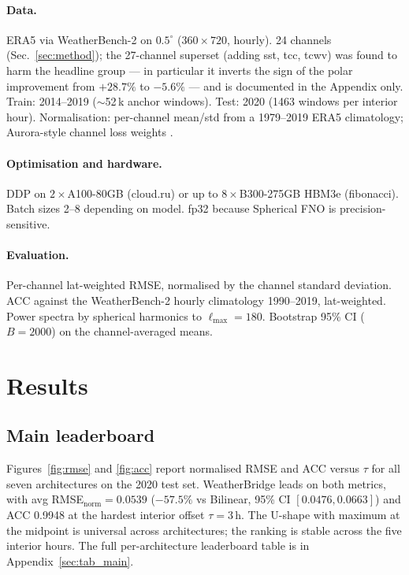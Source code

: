 \documentclass[10pt,letterpaper,twocolumn]{article}
\begin{document}
\paragraph{Data.} ERA5 \cite{hersbach2020era5} via WeatherBench-2
\cite{rasp2024weatherbench} on $0.5^\circ$ ($360{\times}720$, hourly).
24 channels (Sec.~\ref{sec:method}); the 27-channel superset (adding
sst, tcc, tcwv) was found to harm the headline group --- in particular it
inverts the sign of the polar improvement from $+28.7\%$ to $-5.6\%$ ---
and is documented in the Appendix only. Train: 2014--2019
($\sim$52\,k anchor windows). Test: 2020 (1463 windows per interior
hour). Normalisation: per-channel mean/std from a 1979--2019 ERA5
climatology; Aurora-style channel loss weights
\cite{bodnar2024aurora}.

\paragraph{Optimisation and hardware.} DDP on $2{\times}$A100-80GB
(cloud.ru) or up to $8{\times}$B300-275GB HBM3e (fibonacci). Batch sizes
2--8 depending on model. fp32 because Spherical FNO is precision-sensitive.

\paragraph{Evaluation.} Per-channel lat-weighted RMSE, normalised by the
channel standard deviation. ACC against the WeatherBench-2 hourly
climatology 1990--2019, lat-weighted. Power spectra by spherical
harmonics to $\ell_{\max}{=}180$. Bootstrap 95\% CI ($B{=}2000$) on the
channel-averaged means.

\section{Results}
\label{sec:results}

\subsection{Main leaderboard}

Figures~\ref{fig:rmse} and \ref{fig:acc} report normalised RMSE and
ACC versus $\tau$ for all seven architectures on the 2020 test set.
WeatherBridge leads on both metrics, with avg RMSE$_\text{norm}{=}0.0539$
($-57.5\%$ vs Bilinear, 95\% CI $[0.0476, 0.0663]$) and ACC 0.9948 at the
hardest interior offset $\tau{=}3\,$h. The U-shape with maximum at the
midpoint is universal across architectures; the ranking is stable
across the five interior hours. The full per-architecture leaderboard
table is in Appendix~\ref{sec:tab_main}.
\end{document}
